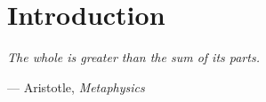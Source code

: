 \chapter{Introduction}
\setcounter{page}{1}

\epigraph{\itshape The whole is greater than the sum of its parts.}{--- Aristotle, \textit{Metaphysics}}
